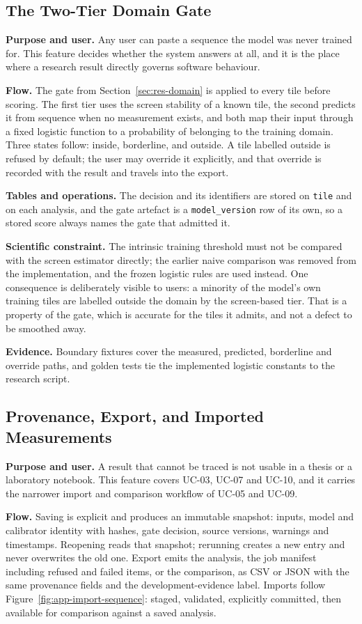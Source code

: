 \subsection{The Two-Tier Domain Gate}
\textbf{Purpose and user.} Any user can paste a sequence the model was never trained for. This
feature decides whether the system answers at all, and it is the place where a research result
directly governs software behaviour.

\textbf{Flow.} The gate from Section~\ref{sec:res-domain} is applied to every tile before scoring.
The first tier uses the screen stability of a known tile, the second predicts it from sequence when
no measurement exists, and both map their input through a fixed logistic function to a probability of
belonging to the training domain. Three states follow: inside, borderline, and outside. A tile
labelled outside is refused by default; the user may override it explicitly, and that override is
recorded with the result and travels into the export.

\textbf{Tables and operations.} The decision and its identifiers are stored on \texttt{tile} and on
each analysis, and the gate artefact is a \texttt{model\_version} row of its own, so a stored score
always names the gate that admitted it.

\textbf{Scientific constraint.} The intrinsic training threshold must not be compared with the
screen estimator directly; the earlier naive comparison was removed from the implementation, and the
frozen logistic rules are used instead. One consequence is deliberately visible to users: a minority
of the model's own training tiles are labelled outside the domain by the screen-based tier. That is a
property of the gate, which is accurate for the tiles it admits, and not a defect to be smoothed
away.

\textbf{Evidence.} Boundary fixtures cover the measured, predicted, borderline and override paths,
and golden tests tie the implemented logistic constants to the research script.

\subsection{Provenance, Export, and Imported Measurements}
\textbf{Purpose and user.} A result that cannot be traced is not usable in a thesis or a laboratory
notebook. This feature covers UC-03, UC-07 and UC-10, and it carries the narrower import and
comparison workflow of UC-05 and UC-09.

\textbf{Flow.} Saving is explicit and produces an immutable snapshot: inputs, model and calibrator
identity with hashes, gate decision, source versions, warnings and timestamps. Reopening reads that
snapshot; rerunning creates a new entry and never overwrites the old one. Export emits the analysis,
the job manifest including refused and failed items, or the comparison, as CSV or JSON with the same
provenance fields and the development-evidence label. Imports follow
Figure~\ref{fig:app-import-sequence}: staged, validated, explicitly committed, then available for
comparison against a saved analysis.

